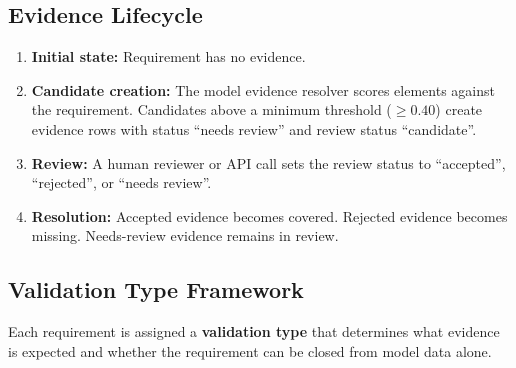\documentclass[10pt,letterpaper]{article}
\begin{document}
\subsection{Evidence Lifecycle}

\begin{enumerate}
  \item \textbf{Initial state:} Requirement has no evidence.
  \item \textbf{Candidate creation:} The model evidence resolver scores elements against the
        requirement. Candidates above a minimum threshold ($\ge 0.40$) create evidence rows with
        status ``needs review'' and review status ``candidate''.
  \item \textbf{Review:} A human reviewer or API call sets the review status to ``accepted'',
        ``rejected'', or ``needs review''.
  \item \textbf{Resolution:} Accepted evidence becomes covered. Rejected evidence becomes missing.
        Needs-review evidence remains in review.
\end{enumerate}

\subsection{Validation Type Framework}
\label{sec:validation-types}

Each requirement is assigned a \textbf{validation type} that determines what evidence is expected
and whether the requirement can be closed from model data alone.
\end{document}
